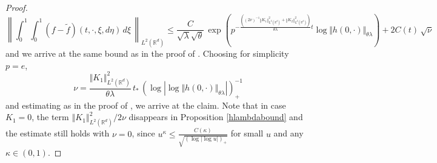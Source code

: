 \documentclass[10pt]{article}
\newcommand*{\norm}[1]{\left\Vert{#1}\right\Vert}
\newcommand*{\abs}[1]{\left\vert{#1}\right\vert}
\newcommand{\R}{\mathbb{R}}
\newcommand{\nic}[1]{ }
\begin{document}
\begin{proof}
\[
\left\| \int_0^1 \int_0^1 ( f -\tilde f) (t,\cdot, \xi,d\eta)\,d\xi\,\right\|_{L^2(\R^d)}  \leq \frac{C}{\sqrt{\lambda}\sqrt{\theta}}\,\exp\left(p^{-\frac{\left((2\nu)^{-1}\norm{K_1}_{L^{2}(\R^d)}^2  + \norm{K_2}_{L^{2}(\R^d)}^2\right)}{\theta\lambda}t}\log \Vert h(0,\cdot)\Vert_{\theta\lambda}\right)+2C(t)\,\sqrt{\nu}
\]
and we arrive at the same bound as in the proof of \cite[Lemma 10]{nasza}. Choosing for simplicity
 $p=e$,
\[
\nu=\frac{\Vert K_1\Vert_{L^2(\R^d)}^2}{\theta\lambda}\,t_*\,(\log |\log \Vert h(0,\cdot)\Vert_{\theta\lambda}|)_+^{-1}
\]
and estimating as in the proof of \cite[Lemma 10]{nasza}, we arrive at the claim. Note that in case $K_1 = 0$, the term $\norm{K_1}^2_{L^2(\R^d)}/2\nu$ disappears in Proposition \ref{hlambdabound} and the estimate still holds with $\nu=0$, since $u^{\kappa} \leq \frac{C(\kappa)}{\sqrt{(\log\abs{\log u})_{+}}}$ for small $u$ and any $\kappa \in (0,1)$. 
\nic{
Then,
\begin{align}\label{fest7}
   \left\| \int_0^1  \int_0^1 ( f -\tilde f) (t,\cdot, \xi,d\eta)\,d\xi\,\right\|_{L^2(\R^d)}&\leq \frac{C_{p,\theta}}{\sqrt{\lambda}}\,\exp(e^{-\frac{t}{2t_*}(\log|\log\norm{h(0,\cdot)}_{\theta\lambda}|)_{+}}\log \norm{h(0,\cdot)}_{\theta\lambda})  \\ \nonumber
   &+ 2 C(t)\frac{\Vert K_1\Vert_{L^2(\R^d)}e^{At_*}}{\sqrt{\theta\lambda}}\,\sqrt{t_*}\,\frac{1}{\sqrt{(\log |\log \Vert (0,\cdot)\Vert_{\theta\lambda}|)_+}}.
\end{align}
Note that $\lambda$ was chosen in such a way that $\norm{h(0,\cdot)}_{\lambda} < 1$. Since $\theta < 1$ also $\norm{h(0,\cdot)}_{\theta\lambda} < 1$ and we may estimate as follows
\begin{align*}
    &\exp(e^{-\frac{t}{2t_*}(\log|\log\norm{h(0,\cdot)}_{\theta\lambda}|)_{+}}\log \norm{h(0,\cdot)}_{\theta\lambda}) \leq \exp(e^{-(\log|\log\norm{h(0,\cdot)}_{\theta\lambda}|^\frac{1}{2})_{+}}\log \norm{h(0,\cdot)}_{\theta\lambda})\\
    &= \exp\left(\frac{\log\norm{h(0,\cdot)}_{\theta\lambda}}{\abs{\log\norm{h(0,\cdot)}_{\theta\lambda}}^{\frac{1}{2}}}\right) = \exp\left(-\abs{\log\norm{h(0,\cdot)}_{\theta\lambda}}^{\frac{1}{2}}\right) \leq \frac{1}{(\log |\log \Vert h(0,\cdot)\Vert_{\theta\lambda}|)_+^\frac{1}{2}}. 
\end{align*}
Inserting the above estimate in (\ref{fest7}) and noting that $C(t)$ is an increasing function of time we arrive at the claim of lemma.
}
\end{proof}
\end{document}
